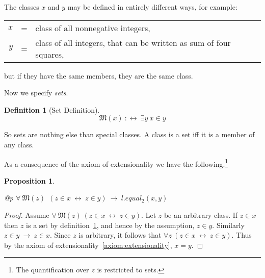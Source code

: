 \documentclass[a4paper,german,10pt,twoside]{book}
\newtheorem{prop}[thm]{Proposition}
\theoremstyle{definition}
\newtheorem{defn}[thm]{Definition}
\theoremstyle{remark}
\begin{document}
The classes $x$ and $y$ may be defined in entirely different ways, for example:
\par
\begin{tabularx}{\linewidth}{rcX}
  $x$ & = & class of all nonnegative integers, \\
  $y$ & = & class of all integers, that can be written as sum of four squares,
\end{tabularx}
\par
but if they have the same members, they are the same class.


\par
Now we specify \emph{sets}.

\begin{defn}[Set Definition]
\label{isSet} \hypertarget{isSet}{}
$$\mathfrak{M}(x)\ :\leftrightarrow \ \exists y\ x \in y$$

\end{defn}

So sets are nothing else than special classes. A class is a set iff it is a member of any class.


\par
As a consequence of the axiom of extensionality we have the following.\footnote{The quantification over $z$ is restricted to sets.}

\begin{prop}
\label{module1:theorem} \hypertarget{module1:theorem}{}
\mbox{}
\begin{longtable}{{@{\extracolsep{\fill}}p{\linewidth}}}
\centering $\forall \ \mathfrak{M}(z)\ \ (z \in x\ \leftrightarrow \ z \in y)\ \rightarrow \ l.equal_2(x, y)$
\end{longtable}

\end{prop}
\begin{proof}
Assume $\forall \ \mathfrak{M}(z) \ ( z \in x \ \leftrightarrow \ z \in y)$. Let $z$ be an arbitrary class. If $z \in x$ then $z$ is a set by definition~\ref{isSet}, and hence by the assumption, $z \in y$. Similarly $z \in y \ \rightarrow \ z \in x$. Since $z$ is arbitrary, it follows that $\forall z \ (z \in x \ \leftrightarrow \ z \in y)$. Thus by the axiom of extensionality~\ref{axiom:extensionality}, $x = y$.
\end{proof}






\backmatter

 \printindex
\end{document}
